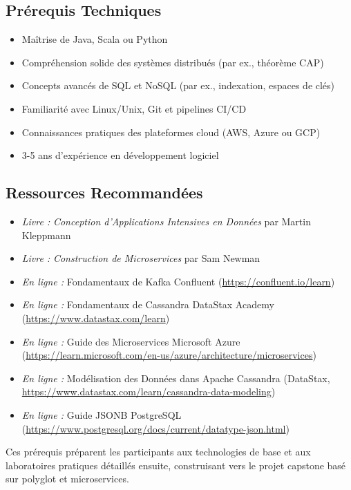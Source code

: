 \documentclass[11pt]{article}
\begin{document}
\subsection{Prérequis Techniques}
\begin{itemize}
    \item Maîtrise de Java, Scala ou Python
    \item Compréhension solide des systèmes distribués (par ex., théorème CAP)
    \item Concepts avancés de SQL et NoSQL (par ex., indexation, espaces de clés)
    \item Familiarité avec Linux/Unix, Git et pipelines CI/CD
    \item Connaissances pratiques des plateformes cloud (AWS, Azure ou GCP)
    \item 3-5 ans d'expérience en développement logiciel
\end{itemize}

\subsection{Ressources Recommandées}
\begin{itemize}
    \item \textit{Livre :} \textit{Conception d'Applications Intensives en Données} par Martin Kleppmann
    \item \textit{Livre :} \textit{Construction de Microservices} par Sam Newman
    \item \textit{En ligne :} Fondamentaux de Kafka Confluent (\url{https://confluent.io/learn})
    \item \textit{En ligne :} Fondamentaux de Cassandra DataStax Academy (\url{https://www.datastax.com/learn})
    \item \textit{En ligne :} Guide des Microservices Microsoft Azure (\url{https://learn.microsoft.com/en-us/azure/architecture/microservices})
    \item \textit{En ligne :} Modélisation des Données dans Apache Cassandra (DataStax, \url{https://www.datastax.com/learn/cassandra-data-modeling})
    \item \textit{En ligne :} Guide JSONB PostgreSQL (\url{https://www.postgresql.org/docs/current/datatype-json.html})
\end{itemize}

Ces prérequis préparent les participants aux technologies de base et aux laboratoires pratiques détaillés ensuite, construisant vers le projet capstone basé sur polyglot et microservices.
\end{document}
